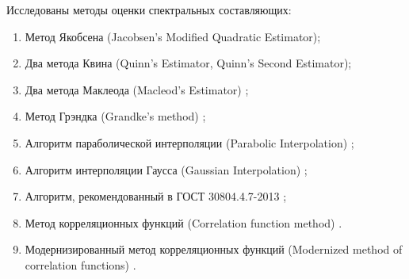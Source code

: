 Исследованы методы оценки спектральных составляющих:
\begin{enumerate}
	\item	Метод Якобсена (Jacobsen's Modified Quadratic Estimator)\cite{4205098, jacobsen1994local, jacobsen2007fast, ericjacobsen_cite};
	\item	Два метода Квина (Quinn's Estimator, Quinn's Second Estimator)\cite{558515, 295186, 330402};
	\item	Два метода Маклеода (Macleod's Estimator) \cite{651200, 1055282};
	\item	Метод Грэндка (Grandke's method) \cite{4315077};
	\item	Алгоритм параболической интерполяции (Parabolic Interpolation) \cite{Konopatskiy_2020, LACHANCE1991143, gasior2004improving, 7818824};
	\item	Алгоритм интерполяции Гаусса (Gaussian Interpolation) \cite{gasior2004improving, gu2005leaf, gilboa2014image};
	\item	Алгоритм, рекомендованный в ГОСТ 30804.4.7-2013 \cite{GOST30804.4.7-2013};
	\item	Метод корреляционных функций (Correlation function method) \cite{Altman2012definition, Altman2012promotion, Altman2012improvement, WANG20175}.
	\item Модернизированный метод корреляционных функций (Modernized method of correlation functions) \cite{Altman2012promotion, Elizarov2016analysis, Increase_Accuracy_Yelizarov2014}.
\end{enumerate}



